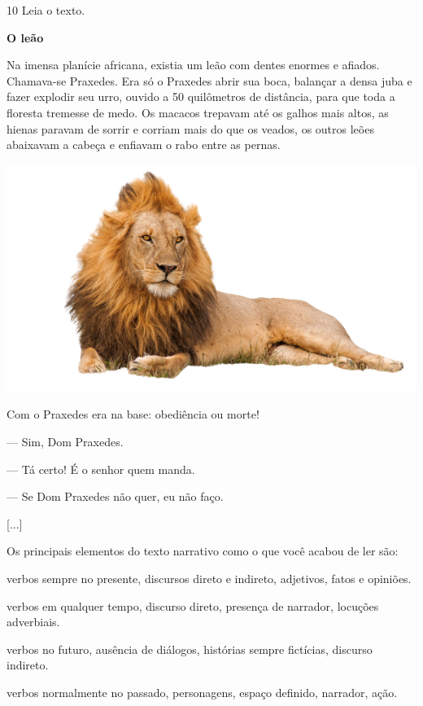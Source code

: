 \num{10} Leia o texto.

\begin{myquote}
\textbf{O leão}

Na imensa planície africana, existia um leão com dentes enormes e
afiados. Chamava-se Praxedes. Era só o Praxedes abrir sua boca, balançar
a densa juba e fazer explodir seu urro, ouvido a 50 quilômetros de
distância, para que toda a floresta tremesse de medo. Os macacos
trepavam até os galhos mais altos, as hienas paravam de sorrir e corriam
mais do que os veados, os outros leões abaixavam a cabeça e enfiavam o
rabo entre as pernas.

\begin{center}
\includegraphics[width=.8\textwidth]{./media/image23n.png}
\end{center}

Com o Praxedes era na base: obediência ou morte!

--- Sim, Dom Praxedes.

--- Tá certo! É o senhor quem manda.

--- Se Dom Praxedes não quer, eu não faço.

{[}...{]}

\end{myquote}

Os principais elementos do texto narrativo como o que você acabou de ler
são:

\begin{escolha}
\item verbos sempre no presente, discursos direto e indireto, adjetivos, fatos e opiniões.

\item verbos em qualquer tempo, discurso direto, presença de narrador, locuções adverbiais.

\item verbos no futuro, ausência de diálogos, histórias sempre fictícias, discurso indireto.

\item verbos normalmente no passado, personagens, espaço definido, narrador, ação.
\end{escolha}


